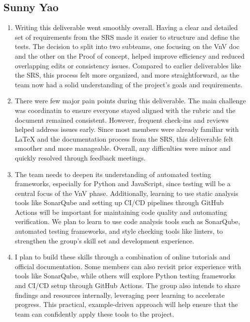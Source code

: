 \documentclass[12pt, titlepage]{article}
\begin{document}
\subsection*{Sunny Yao}
\begin{enumerate}
    \item Writing this deliverable went smoothly overall. Having a clear and detailed set of requirements from the SRS made it easier to structure and define the tests. 
    The decision to split into two subteams, one focusing on the VnV doc and the other on the Proof of concept, helped improve efficiency and reduced overlapping edits or 
    consistency issues. Compared to earlier deliverables like the SRS, this process felt more organized, and more straightforward, 
    as the team now had a solid understanding of the project's goals and requirements.
    \item  There were few major pain points during this deliverable. The main challenge was coordinatin to ensure everyone stayed aligned with the rubric and the document 
    remained consistent. However, frequent check-ins and reviews helped address issues early. Since most members were already familiar with LaTeX and the documentation 
    process from the SRS, this deliverable felt smoother and more manageable. Overall, any difficulties were minor and quickly resolved through feedback meetings.
    \item The team needs to deepen its understanding of automated testing frameworks, especially for Python and JavaScript, since testing will be a central focus of 
    the VnV phase. Additionally, learning to use static analysis tools like SonarQube and setting up CI/CD pipelines through GitHub Actions will be important for maintaining 
    code quality and automating verification. We plan to learn to use code analysis tools such as SonarQube, automated testing frameworks, and style checking tools like 
    linters, to strengthen the group's skill set and development experience.
    \item I plan to build these skills through a combination of online tutorials and official documentation. Some members can also revisit prior experience with tools like 
    SonarQube, while others will explore Python testing frameworks and CI/CD setup through GitHub Actions. The group also intends to share findings and resources internally, 
    leveraging peer learning to accelerate progress. This practical, example-driven approach will help ensure that the team can confidently apply these tools to the project.
    
\end{enumerate}
\end{document}

